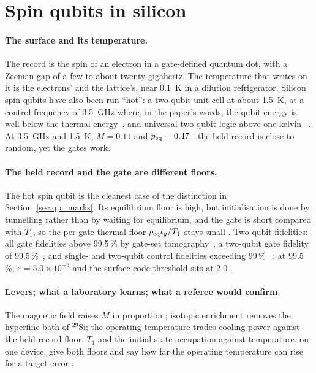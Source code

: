 \section{Spin qubits in silicon}\label{sec:qp_si}
\paragraph{The surface and its temperature.} The record is the spin of an electron in a gate-defined quantum dot, with a Zeeman gap of a few
to about twenty gigahertz. The temperature that writes on it is the electrons' and the lattice's, near 0.1~K in a dilution refrigerator.
Silicon spin qubits have also been run ``hot'': a two-qubit unit cell at about 1.5~K, at a control frequency of 3.5~GHz where, in the paper's
words, the qubit energy is well below the thermal energy~\cite{Yang2020hot}, and universal two-qubit logic above one kelvin~\cite{Petit2020hot}
\observed. At 3.5~GHz and 1.5~K, $M=0.11$ and $p_{\rm eq}=0.47$ \calc: the held record is close to random, yet the gates work.

\paragraph{The held record and the gate are different floors.} The hot spin qubit is the cleanest case of the distinction in
Section~\ref{sec:qp_marks}. Its equilibrium floor is high, but initialisation is done by tunnelling rather than by waiting for equilibrium,
and the gate is short compared with $T_1$, so the per-gate thermal floor $p_{\rm eq}t_g/T_1$ stays small \derived. Two-qubit fidelities: all
gate fidelities above 99.5\,\% by gate-set tomography~\cite{Xue2022}, a two-qubit gate fidelity of 99.5\,\%~\cite{Noiri2022}, and single- and
two-qubit control fidelities exceeding 99\,\%~\cite{Mills2022} \observed; at 99.5\,\%, $\varepsilon=5.0\times10^{-3}$ and the surface-code
threshold sits at 2.0 \calc.

\paragraph{Levers; what a laboratory learns; what a referee would confirm.} The magnetic field raises $M$ in proportion \derived; isotopic enrichment
removes the hyperfine bath of $^{29}$Si; the operating temperature trades cooling power against the held-record floor. $T_1$ and the
initial-state occupation against temperature, on one device, give both floors and say how far the operating temperature can rise for a
target error \interp.

